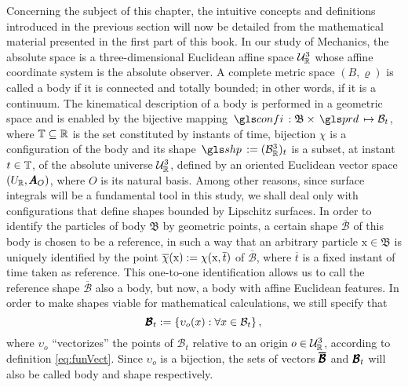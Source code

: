 Concerning the subject of this chapter, the intuitive concepts and definitions introduced in the previous section will now be detailed from the mathematical material presented in the first part of this book. In our study of Mechanics, the absolute space is a three-dimensional Euclidean affine space $\eamd{U}{R}{3}$ whose affine coordinate system is the absolute observer. A complete metric space $(B,\varrho)$ is called a body  if it is connected and totally bounded; in other words, if it is a continuum. The kinematical description of a body is performed in a geometric space and is enabled by the bijective mapping $\map{\gloref{confi}}{\mathfrak{B}\times\gloref{prd}}{\mathcal{B}_t}$, where $\tempo\subseteq\real$ is the set constituted by instants of time, bijection $\chi$ is a configuration of the body and its shape $\gloref{shp}:=(\eamd{B}{R}{3})_t$ is a subset, at instant $t\in\tempo$, of the absolute universe $\eamd{U}{R}{3}$, defined by an oriented Euclidean vector space $(U_\real,\tnr{A}_O)$, where $O$ is its natural basis. Among other reasons, since surface integrals will be a fundamental tool in this study, we shall deal only with configurations that define shapes bounded by Lipschitz surfaces. In order to identify the particles of body $\mathfrak{B}$ by geometric points, a certain shape $\overline{\mathcal{B}}$ of this body is chosen to be a reference, in such a way that an arbitrary particle $\text{x}\in\mathfrak{B}$ is uniquely identified by the point $\fua{\overline{\chi}}{\text{x}}:=\fua{\chi}{\text{x},\overline{t}}$ of $\overline{\mathcal{B}}$, where $\overline{t}$ is a fixed instant of time taken as reference. This one-to-one identification allows us to call the reference shape $\overline{\mathcal{B}}$ also a body, but now, a body with affine Euclidean features. In order to make shapes viable for mathematical calculations, we still specify that
\begin{equation}
\tnr{\mathcal{B}}_t:=\{\fua{\upsilon_o}{x}:\forall x\in\mathcal{B}_t\}\,,
\end{equation}
where $\upsilon_o$ ``vectorizes'' the points of $\mathcal{B}_t$ relative to an origin $o\in\eamd{U}{R}{3}$, according to definition \eqref{eq:funVect}. Since $\upsilon_o$ is a bijection, the sets of vectors $\tnr{\overline{\mathcal{B}}}$ and $\tnr{\mathcal{B}}_t$ will also be called body and shape respectively.

